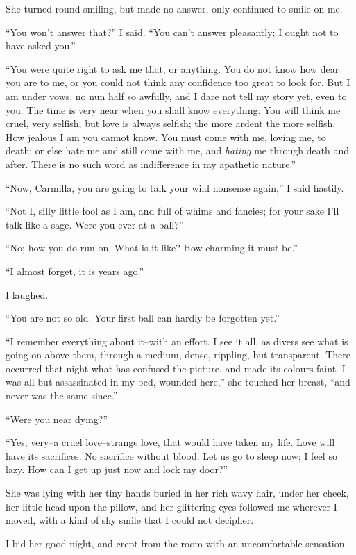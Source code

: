 \documentclass[11pt,twoside,makeidx,hidelinks,]{memoir}
\begin{document}
She turned round smiling, but made no answer, only continued to smile on
me.

``You won't answer that?'' I said. ``You can't answer pleasantly; I ought
not to have asked you.''

``You were quite right to ask me that, or anything. You do not know how
dear you are to me, or you could not think any confidence too great to
look for.  But I am under vows, no nun half so awfully, and I dare not
tell my story yet, even to you. The time is very near when you shall
know everything. You will think me cruel, very selfish, but love is
always selfish; the more ardent the more selfish. How jealous I am you
cannot know. You must come with me, loving me, to death; or else hate me
and still come with me, and \emph{hating} me through death and after. There
is no such word as indifference in my apathetic nature.''

``Now, Carmilla, you are going to talk your wild nonsense again,'' I said
hastily.

``Not I, silly little fool as I am, and full of whims and fancies; for
your sake I'll talk like a sage. Were you ever at a ball?''

``No; how you do run on. What is it like? How charming it must be.''

``I almost forget, it is years ago.''

I laughed.

``You are not so old. Your first ball can hardly be forgotten yet.''

``I remember everything about it--with an effort. I see it all, as divers
see what is going on above them, through a medium, dense, rippling, but
transparent. There occurred that night what has confused the picture,
and made its colours faint. I was all but assassinated in my bed,
wounded here,'' she touched her breast, ``and never was the same since.''

``Were you near dying?''

``Yes, very--a cruel love--strange love, that would have taken my life.
Love will have its sacrifices. No sacrifice without blood. Let us go to
sleep now; I feel so lazy. How can I get up just now and lock my door?''

She was lying with her tiny hands buried in her rich wavy hair, under
her cheek, her little head upon the pillow, and her glittering eyes
followed me wherever I moved, with a kind of shy smile that I could
not decipher.

I bid her good night, and crept from the room with an uncomfortable
sensation.
\end{document}
